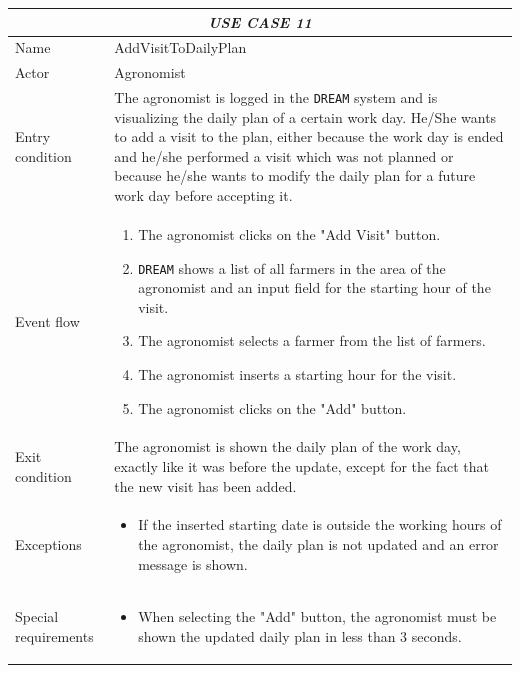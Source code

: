 \documentclass{article}
\begin{document}
\centering
\begin{longtable}{|p{3.5cm}|m{8cm}|}
 \hline
 \multicolumn{2}{|c|}{\cellcolor{white}\emph{USE CASE 11}} \\
 \endfirsthead
 \endhead
 \endfoot
 \endlastfoot
 \hline
 Name & AddVisitToDailyPlan\\
 \hline
 Actor & Agronomist\\
 \hline
 Entry condition & The agronomist is logged in the \verb|DREAM| system and is visualizing the daily plan of a certain work day. He/She wants to add a visit to the plan, either because the work day is ended and he/she performed a visit which was not planned or because he/she wants to modify the daily plan for a future work day before accepting it.\\
 \hline
 Event flow & \begin{enumerate}
    \item The agronomist clicks on the "Add Visit" button.
    \item \verb|DREAM| shows a list of all farmers in the area of the agronomist and an input field for the starting hour of the visit.
    \item The agronomist selects a farmer from the list of farmers.
    \item The agronomist inserts a starting hour for the visit.
    \item The agronomist clicks on the "Add" button.
 \end{enumerate}\\
 \hline
 Exit condition & The agronomist is shown the daily plan of the work day, exactly like it was before the update, except for the fact that the new visit has been added.\\
 \hline
 Exceptions & \begin{itemize}
     \item If the inserted starting date is outside the working hours of the agronomist, the daily plan is not updated and an error message is shown.
 \end{itemize}\\
 \hline
 Special requirements &\begin{itemize}
     \item When selecting the "Add" button, the agronomist must be shown the updated daily plan in less than 3 seconds.
 \end{itemize}\\
 \hline
\end{longtable}
\end{document}
